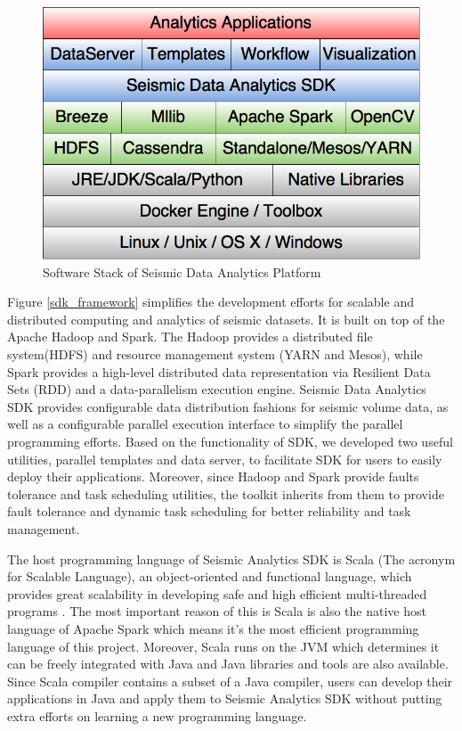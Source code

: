 \begin{figure}[h]
\centering
\includegraphics[scale=0.4]{figures/sdk_swstack.png}
\caption{Software Stack of Seismic Data Analytics Platform}
\label{sdk_swstack}
\end{figure}

Figure \ref{sdk_framework} simplifies the development efforts for scalable and distributed computing and analytics of seismic datasets. It is built on top of the Apache Hadoop and Spark. The Hadoop provides a distributed file system(HDFS) and resource management system (YARN and Mesos), while Spark provides a high-level distributed data representation via Resilient Data Sets (RDD) and a data-parallelism execution engine. Seismic Data Analytics SDK provides configurable data distribution fashions for seismic volume data, as well as a configurable parallel execution interface to simplify the parallel programming efforts. Based on the functionality of SDK, we developed two useful utilities, parallel templates and data server, to facilitate SDK for users to easily deploy their applications. Moreover, since Hadoop and Spark provide faults tolerance and task scheduling utilities, the toolkit inherits from them to provide fault tolerance and dynamic task scheduling for better reliability and task management.

The host programming language of Seismic Analytics SDK is Scala (The acronym for Scalable Language), an object-oriented and functional language, which provides great scalability in developing safe and high efficient multi-threaded programs \cite{ScalaOrg}. The most important reason of this is Scala is also the native host language of Apache Spark which means it's the most efficient programming language of this project. Moreover, Scala runs on the JVM which determines it can be freely integrated with Java and Java libraries and tools are also available. Since Scala compiler contains a subset of a Java compiler, users can develop their applications in Java and apply them to Seismic Analytics SDK without putting extra efforts on learning a new programming language.

